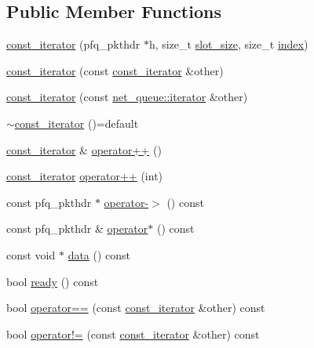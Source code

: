 \subsection*{Public Member Functions}
\begin{DoxyCompactItemize}
\item 
\hyperlink{structpfq_1_1net__queue_1_1const__iterator_adef1573899cd3f86946660ac3e1d4b0b}{const\+\_\+iterator} (pfq\+\_\+pkthdr $\ast$h, size\+\_\+t \hyperlink{classpfq_1_1net__queue_a29b652b2c4e672bdfe65709483ad4319}{slot\+\_\+size}, size\+\_\+t \hyperlink{classpfq_1_1net__queue_a6f328cf50f038056f2b761bfaeca4c91}{index})
\item 
\hyperlink{structpfq_1_1net__queue_1_1const__iterator_a4ebcb8be6a56b2a132b5ecb6450a253f}{const\+\_\+iterator} (const \hyperlink{structpfq_1_1net__queue_1_1const__iterator}{const\+\_\+iterator} \&other)
\item 
\hyperlink{structpfq_1_1net__queue_1_1const__iterator_ad9eae4275472c07254d3d561a50cf5f0}{const\+\_\+iterator} (const \hyperlink{structpfq_1_1net__queue_1_1iterator}{net\+\_\+queue\+::iterator} \&other)
\item 
\hyperlink{structpfq_1_1net__queue_1_1const__iterator_ab5533378a3b4b5b9aa0f8b2b43f33cf5}{$\sim$const\+\_\+iterator} ()=default
\item 
\hyperlink{structpfq_1_1net__queue_1_1const__iterator}{const\+\_\+iterator} \& \hyperlink{structpfq_1_1net__queue_1_1const__iterator_a7f460bac19b566ae12820ba8e0aa476f}{operator++} ()
\item 
\hyperlink{structpfq_1_1net__queue_1_1const__iterator}{const\+\_\+iterator} \hyperlink{structpfq_1_1net__queue_1_1const__iterator_a7a38cf885fe28b63309e88c6d1d92b00}{operator++} (int)
\item 
const pfq\+\_\+pkthdr $\ast$ \hyperlink{structpfq_1_1net__queue_1_1const__iterator_aec46f19d1306193a434aeb009437664b}{operator-\/$>$} () const
\item 
const pfq\+\_\+pkthdr \& \hyperlink{structpfq_1_1net__queue_1_1const__iterator_aee86a5a178f44829ca9ea971748577b4}{operator$\ast$} () const
\item 
const void $\ast$ \hyperlink{structpfq_1_1net__queue_1_1const__iterator_a47a268a78aa534b3cf064c58e69320b3}{data} () const
\item 
bool \hyperlink{structpfq_1_1net__queue_1_1const__iterator_aa086fec495f365981c86348de5750f7b}{ready} () const
\item 
bool \hyperlink{structpfq_1_1net__queue_1_1const__iterator_a4b38c35b765584ef7235abf6ff09398c}{operator==} (const \hyperlink{structpfq_1_1net__queue_1_1const__iterator}{const\+\_\+iterator} \&other) const
\item 
bool \hyperlink{structpfq_1_1net__queue_1_1const__iterator_acfde8b0d1f4a9183cc1b1886ae74c1f9}{operator!=} (const \hyperlink{structpfq_1_1net__queue_1_1const__iterator}{const\+\_\+iterator} \&other) const
\end{DoxyCompactItemize}


